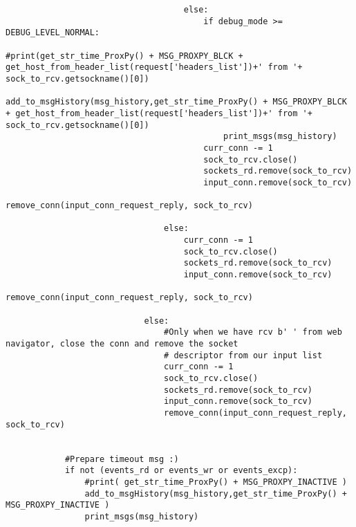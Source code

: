 \begin{verbatim}
                                    else:
                                        if debug_mode >= DEBUG_LEVEL_NORMAL:
                                            #print(get_str_time_ProxPy() + MSG_PROXPY_BLCK + get_host_from_header_list(request['headers_list'])+' from '+ sock_to_rcv.getsockname()[0])
                                            add_to_msgHistory(msg_history,get_str_time_ProxPy() + MSG_PROXPY_BLCK + get_host_from_header_list(request['headers_list'])+' from '+ sock_to_rcv.getsockname()[0])
                                            print_msgs(msg_history)
                                        curr_conn -= 1
                                        sock_to_rcv.close()
                                        sockets_rd.remove(sock_to_rcv)
                                        input_conn.remove(sock_to_rcv)
                                        remove_conn(input_conn_request_reply, sock_to_rcv)
                                
                                else:
                                    curr_conn -= 1
                                    sock_to_rcv.close()
                                    sockets_rd.remove(sock_to_rcv)
                                    input_conn.remove(sock_to_rcv)
                                    remove_conn(input_conn_request_reply, sock_to_rcv)

                            else:
                                #Only when we have rcv b' ' from web navigator, close the conn and remove the socket
                                # descriptor from our input list
                                curr_conn -= 1
                                sock_to_rcv.close()
                                sockets_rd.remove(sock_to_rcv)
                                input_conn.remove(sock_to_rcv)
                                remove_conn(input_conn_request_reply, sock_to_rcv)


            #Prepare timeout msg :)
            if not (events_rd or events_wr or events_excp):
                #print( get_str_time_ProxPy() + MSG_PROXPY_INACTIVE )
                add_to_msgHistory(msg_history,get_str_time_ProxPy() + MSG_PROXPY_INACTIVE )
                print_msgs(msg_history)
                
\end{verbatim}